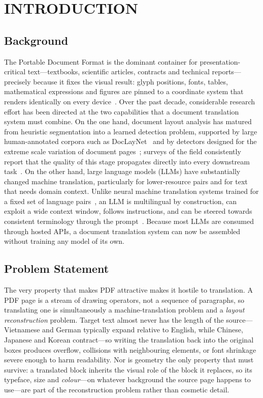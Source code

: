 \section{INTRODUCTION}
\label{sec:introduction}

\subsection{Background}

The Portable Document Format is the dominant container for
presentation-critical text---textbooks, scientific articles, contracts and
technical reports---precisely because it fixes the visual result: glyph
positions, fonts, tables, mathematical expressions and figures are pinned to a
coordinate system that renders identically on every device~\citep{pdf-spec}.
Over the past decade, considerable research effort has been directed at the two
capabilities that a document translation system must combine. On the one hand,
document layout analysis has matured from heuristic segmentation into a
learned detection problem, supported by large human-annotated corpora such as
DocLayNet~\citep{doclaynet} and by detectors designed for the extreme scale
variation of document pages~\citep{doclayout-yolo}; surveys of the field
consistently report that the quality of this stage propagates directly into
every downstream task~\citep{doclayout-survey}. On the other hand, large
language models (LLMs) have substantially changed machine translation,
particularly for lower-resource pairs and for text that needs domain context.
Unlike neural machine translation systems trained for a fixed set of language
pairs~\citep{nmt-survey}, an LLM is multilingual by construction, can exploit a
wide context window, follows instructions, and can be steered towards
consistent terminology through the prompt~\citep{gpt-mt,llm-multilingual-mt}.
Because most LLMs are consumed through hosted APIs, a document translation
system can now be assembled without training any model of its own.

\subsection{Problem Statement}

The very property that makes PDF attractive makes it hostile to translation. A
PDF page is a stream of drawing operators, not a sequence of paragraphs, so
translating one is simultaneously a machine-translation problem and a
\emph{layout reconstruction} problem. Target text almost never has the length
of the source---Vietnamese and German typically expand relative to English,
while Chinese, Japanese and Korean contract---so writing the translation back
into the original boxes produces overflow, collisions with neighbouring
elements, or font shrinkage severe enough to harm readability. Nor is geometry
the only property that must survive: a translated block inherits the visual
role of the block it replaces, so its typeface, size and \emph{colour}---on
whatever background the source page happens to use---are part of the
reconstruction problem rather than cosmetic detail.

